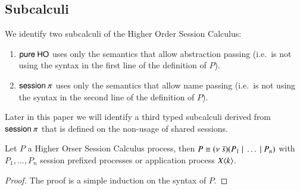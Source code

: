 \subsection{Subcalculi}

We identify two subcalculi of the Higher Order Session Calculus:
\begin{enumerate}
	\item	$\mathsf{pure\ HO}$ uses only the semantics that allow abstraction passing
		(i.e.\ is not using the syntax in the first line of the definition of $P$).
	\item	$\mathsf{session\ }\pi$ uses only the semantics that allow name passing
		(i.e.\ is not using the syntax in the second line of the definition of $P$).
\end{enumerate}

Later in this paper we will identify a third typed subcalculi derived
from $\mathsf{session\ }\pi$ that is defined on the non-usage of shared sessions.

\begin{proposition}[Normalisation]
	\label{prop:normal_form}
	Let $P$ a Higher Orser Session Calculus process, then
	$P \equiv (\nu\ \tilde{s})(P_1 \;|\; \dots \;|\; P_n)$ with
	$P_1, \dots, P_n$ session prefixed processes
	or application process $X\langle k \rangle$.
\end{proposition}

\begin{proof}
	The proof is a simple induction on the syntax of $P$.
\end{proof}
